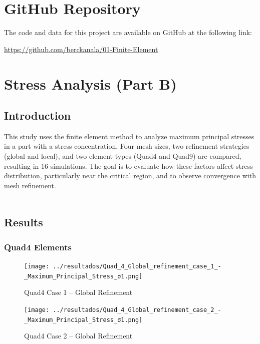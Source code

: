\documentclass[12pt]{article}
\begin{document}
\thispagestyle{empty}
\newpage
{}
\setcounter{page}{1}

\newpage
\section*{GitHub Repository}

The code and data for this project are available on GitHub at the following link:
\begin{center}
    \url{https://github.com/berckanala/01-Finite-Element}
\end{center}


\newpage
\section{Stress Analysis (Part B)}

\subsection{Introduction}
This study uses the finite element method to analyze maximum principal stresses in a part with a stress concentration. Four mesh sizes, two refinement strategies (global and local), and two element types (Quad4 and Quad9) are compared, resulting in 16 simulations. The goal is to evaluate how these factors affect stress distribution, particularly near the critical region, and to observe convergence with mesh refinement.
\\
\\
\subsection{Results}

\subsubsection{Quad4 Elements}

\begin{figure}[H]
    \centering
    \begin{minipage}{0.48\textwidth}
        \centering
        \texttt{[image: ../resultados/Quad\_4\_Global\_refinement\_case\_1\_-\_Maximum\_Principal\_Stress\_σ1.png]}
        \caption{Quad4 Case 1 – Global Refinement}
        \label{fig:quad4_results_global1}
    \end{minipage}
    \hfill
    \begin{minipage}{0.48\textwidth}
        \centering
        \texttt{[image: ../resultados/Quad\_4\_Global\_refinement\_case\_2\_-\_Maximum\_Principal\_Stress\_σ1.png]}
        \caption{Quad4 Case 2 – Global Refinement}
        \label{fig:quad4_results_global2}
    \end{minipage}
\end{figure}
\end{document}

